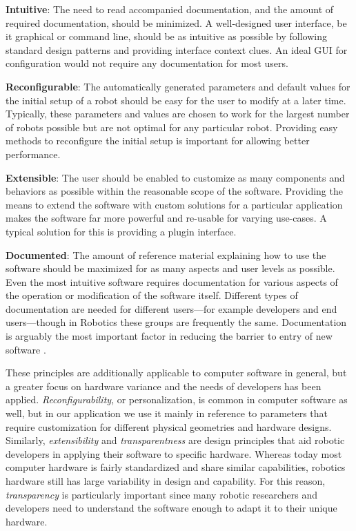\documentclass[10pt,journal,compsoc]{joser1}
\begin{document}
{{\bf Intuitive}: The need to read accompanied documentation, and the amount of
required documentation, should be minimized. A well-designed user interface, be
it graphical or command line, should be as intuitive as possible by following
standard design patterns and providing interface context clues. An ideal GUI for
configuration would not require any documentation for most users.

{\bf Reconfigurable}: The automatically generated parameters and default values
for the initial setup of a robot should be easy for the user to modify at a
later time. Typically, these parameters and values are chosen to work for the
largest number of robots possible but are not optimal for any particular robot.
Providing easy methods to reconfigure the initial setup is important for
allowing better performance. 

{\bf Extensible}: The user should be enabled to customize as many components and
behaviors as possible within the reasonable scope of the software. Providing the
means to extend the software with custom solutions for a particular application
makes the software far more powerful and re-usable for varying use-cases. A
typical solution for this is providing a plugin interface.

{\bf Documented}: The amount of reference material explaining how to use the
software should be maximized for as many aspects and user levels as possible.
Even the most intuitive software requires documentation for various aspects of
the operation or modification of the software itself. Different types of
documentation are needed for different users---for example developers and end
users---though in Robotics these groups are frequently the same. Documentation
is arguably the most important factor in reducing the barrier to entry of new
software \cite{forward2002relevance}.

These principles are additionally applicable to computer software in general, but a greater focus on hardware variance and the needs of developers has been applied. \textit{Reconfigurability}, or personalization, is common in computer software as well, but in our application we use it mainly in reference to parameters that require customization for different physical geometries and hardware designs. Similarly, \textit{extensibility} and \textit{transparentness} are design principles that aid robotic developers in applying their software to specific hardware. Whereas today most computer hardware is fairly standardized and share similar capabilities, robotics hardware still has large variability in design and capability. For this reason, \textit{transparency} is particularly important since many robotic researchers and developers need to understand the software enough to adapt it to their unique hardware.

}
\end{document}
